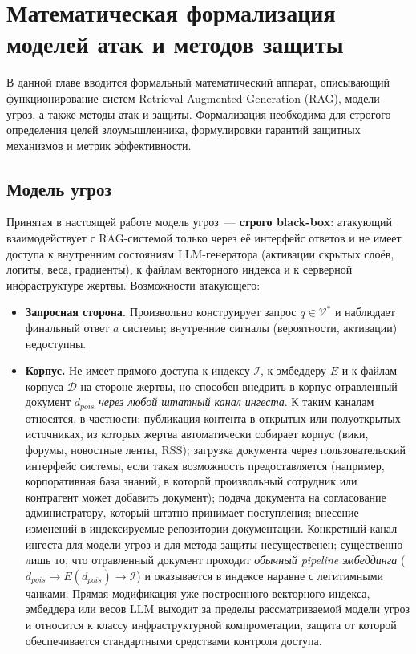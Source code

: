 \documentclass[12pt, a4paper]{article}
\theoremstyle{definition}
\theoremstyle{remark}
\begin{document}
\section{Математическая формализация моделей атак и методов защиты}
\label{sec:math_formalization_chapter}

В данной главе вводится формальный математический аппарат, описывающий функционирование систем Retrieval-Augmented Generation (RAG), модели угроз, а также методы атак и защиты. Формализация необходима для строгого определения целей злоумышленника, формулировки гарантий защитных механизмов и метрик эффективности.

\subsection{Модель угроз}
\label{sec:threat_model}

Принятая в настоящей работе модель угроз~--- \textbf{строго black-box}: атакующий взаимодействует с RAG-системой только через её интерфейс ответов и не имеет доступа к внутренним состояниям LLM-генератора (активации скрытых слоёв, логиты, веса, градиенты), к файлам векторного индекса и к серверной инфраструктуре жертвы. Возможности атакующего:
\begin{itemize}[label=$\bullet$]
    \item \textbf{Запросная сторона.} Произвольно конструирует запрос $q \in \mathcal{V}^*$ и наблюдает финальный ответ $a$ системы; внутренние сигналы (вероятности, активации) недоступны.
    \item \textbf{Корпус.} Не имеет прямого доступа к индексу $\mathcal{I}$, к эмбеддеру $E$ и к файлам корпуса $\mathcal{D}$ на стороне жертвы, но способен внедрить в корпус отравленный документ $d_{pois}$ \textit{через любой штатный канал ингеста}. К таким каналам относятся, в частности: публикация контента в открытых или полуоткрытых источниках, из которых жертва автоматически собирает корпус (вики, форумы, новостные ленты, RSS); загрузка документа через пользовательский интерфейс системы, если такая возможность предоставляется (например, корпоративная база знаний, в которой произвольный сотрудник или контрагент может добавить документ); подача документа на согласование администратору, который штатно принимает поступления; внесение изменений в индексируемые репозитории документации. Конкретный канал ингеста для модели угроз и для метода защиты несущественен; существенно лишь то, что отравленный документ проходит \textit{обычный pipeline эмбеддинга} ($d_{pois} \to E(d_{pois}) \to \mathcal{I}$) и оказывается в индексе наравне с легитимными чанками. Прямая модификация уже построенного векторного индекса, эмбеддера или весов LLM выходит за пределы рассматриваемой модели угроз и относится к классу инфраструктурной компрометации, защита от которой обеспечивается стандартными средствами контроля доступа.
\end{itemize}
\end{document}
